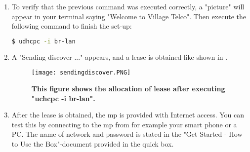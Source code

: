 \begin{enumerate}
\item To verify that the previous command was executed correctly, a "picture" will appear in your terminal saying "Welcome to Village Telco". Then execute the following command to finish the set-up:
\noindent
\begin{lstlisting}[language=bash]
 $ udhcpc -i br-lan
\end{lstlisting}
\item A "Sending discover ..." appears, and a lease is obtained like shown in . 
\begin{figure}[h!]
  \centering
      \texttt{[image: sendingdiscover.PNG]}
  \caption [The results from executing "uchcpc -i br-lan".]{\textbf{This figure shows the allocation of lease after executing "uchcpc -i br-lan".}}
  \label{fig:sendingdiscover}
\end{figure}
\item After the lease is obtained, the \gls{mp} is provided with Internet access. You can test this by connecting to the \gls{mp} from for example your smart phone or a PC. The name of network and password is stated in the "Get Started - How to Use the Box"-document provided in the \gls{quick} box. 
\end{enumerate}
